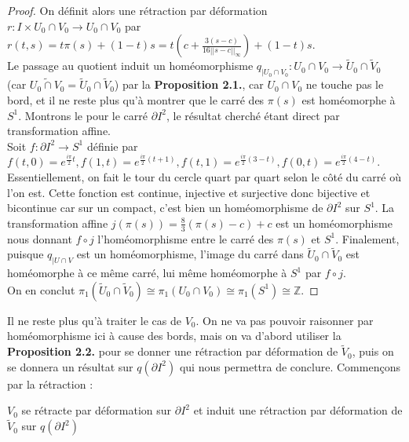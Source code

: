 \begin{proof}
    On définit alors une rétraction par déformation \\
    $r:I\times U_0\cap V_0\rightarrow U_0\cap V_0$ par $r(t,s)=t\pi(s)+(1-t)s=t\left(c+\displaystyle\frac{3(s-c)}{16||s-c||_{\infty}}\right)+(1-t)s$.\medskip\\
    Le passage au quotient induit un homéomorphisme $q_{|U_0\cap V_0}:U_0\cap V_0\rightarrow\tilde{U}_0\cap\tilde{V}_0$ (car $\widetilde{U_0\cap V_0}=\tilde{U}_0\cap\tilde{V}_0$) par la \textbf{Proposition 2.1.}, car $U_0\cap V_0$ ne touche pas le bord, et il ne reste plus qu'à montrer que le carré des $\pi(s)$ est homéomorphe à $S^1$. Montrons le pour le carré $\partial I^2$, le résultat cherché étant direct par transformation affine.\medskip\\
    Soit $f:\partial I^2\rightarrow S^1$ définie par $f(t,0)=e^{\frac{i\pi}{2}t},f(1,t)=e^{\frac{i\pi}{2}(t+1)},f(t,1)=e^{\frac{i\pi}{2}(3-t)},f(0,t)=e^{\frac{i\pi}{2}(4-t)}$. Essentiellement, on fait le tour du cercle quart par quart selon le côté du carré où l'on est. Cette fonction est continue, injective et surjective donc bijective et bicontinue car sur un compact, c'est bien un homéomorphisme de $\partial I^2$ sur $S^1$. La transformation affine $j(\pi(s))=\frac{8}{3}(\pi(s)-c)+c$ est un homéomorphisme nous donnant $f\circ j$ l'homéomorphisme entre le carré des $\pi(s)$ et $S^1$.\newpage
    Finalement, puisque $q_{|U\cap V}$ est un homéomorphisme, l'image du carré dans $\tilde{U}_0\cap\tilde{V}_0$ est homéomorphe à ce même carré, lui même homéomorphe à $S^1$ par $f\circ j$.\medskip\\
    On en conclut $\pi_1(\tilde{U}_0\cap\tilde{V}_0)\cong\pi_1(U_0\cap V_0)\cong\pi_1(S^1)\cong\mathbb{Z}$.
\end{proof}
Il ne reste plus qu'à traiter le cas de $V_0$. On ne va pas pouvoir raisonner par homéomorphisme ici à cause des bords, mais on va d'abord utiliser la \textbf{Proposition 2.2.} pour se donner une rétraction par déformation de $\tilde{V}_0$, puis on se donnera un résultat sur $q(\partial I^2)$ qui nous permettra de conclure. Commençons par la rétraction :
\begin{lemme}
    $V_0$ se rétracte par déformation sur $\partial I^2$ et induit une rétraction par déformation de $\tilde{V}_0$ sur $q(\partial I^2)$
\end{lemme}

